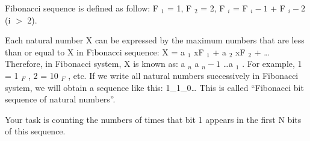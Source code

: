 Fibonacci sequence is defined as follow: F   $_    1   $   = 1, F   $_    2   $   = 2, F   $_    i   $   = F   $_    i-1   $   + F   $_    i-2   $   (i $>$ 2).  

   Each natural number X can be expressed by the maximum numbers that are less than or equal to X in Fibonacci sequence: X = a   $_    1   $   xF   $_    1   $   + a   $_    2   $   xF   $_    2   $   + … Therefore, in Fibonacci system, X is known as: a   $_    n   $   a   $_    n-1   $   …a   $_    1   $   . For example, 1 = 1   $_    F   $   , 2 = 10   $_    F   $   , etc. If we write all natural numbers successively in Fibonacci system, we will obtain a sequence like this: 1\_1\_0… This is called “Fibonacci bit sequence of natural numbers”.  

   Your task is counting the numbers of times that bit 1 appears in the first N bits of this sequence.  

\
